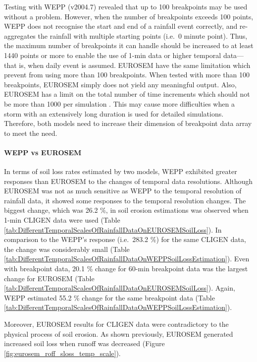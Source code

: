 Testing with WEPP (v2004.7) revealed that up to 100 breakpoints may be used
without a problem. However, when the number of breakpoints exceeds 100
points, WEPP does not recognise the start and end of a rainfall event correctly,
and re-aggregates the rainfall with multiple starting points (i.e.\ 0 minute
point). Thus, the maximum number of breakpoints it can handle should be
increased to at least 1440 points or more to enable the use of 1-min data or
higher temporal data---that is, when daily event is assumed. EUROSEM have the
same limitation which prevent from using more than 100 breakpoints. When tested
with more than 100 breakpoints, EUROSEM simply does not yield any meaningful
output. Also, EUROSEM has a limit on the total number of time increments which
should not be more than 1000 per simulation
\citep{morgan1998-europeansoilerosion}. This may cause more difficulties when a
storm with an extensively long duration is used for detailed simulations.
Therefore, both models need to increase their dimension of breakpoint data array
to meet the need.

\paragraph{WEPP vs EUROSEM} In terms of soil loss rates estimated by two
models, WEPP exhibited greater responses than EUROSEM to the changes of temporal
data resolutions. Although EUROSEM was not as much sensitive as WEPP to the
temporal
resolution of rainfall data, it showed some responses to the temporal resolution
changes.
The biggest change, which was 26.2 \%, in soil erosion estimations was observed
when 1-min CLIGEN data were used (Table
\ref{tab:DifferentTemporalScalesOfRainfallDataOnEUROSEMSoilLoss}).
In comparison to the WEPP's response (i.e.\ 283.2 \%) for the same CLIGEN data,
the change was considerably small (Table
\ref{tab:DifferentTemporalScalesOfRainfallDataOnWEPPSoilLossEstimation}). Even
with breakpoint data, 20.1 \% change for 60-min breakpoint data was the largest
change for EUROSEM (Table
\ref{tab:DifferentTemporalScalesOfRainfallDataOnEUROSEMSoilLoss}). Again, WEPP
estimated 55.2 \% change for the same breakpoint data (Table
\ref{tab:DifferentTemporalScalesOfRainfallDataOnWEPPSoilLossEstimation}).

Moreover, EUROSEM results for CLIGEN data were contradictory to the physical
process of soil erosion. As shown previously, EUROSEM generated increased soil
loss when runoff was decreased (Figure \ref{fig:eurosem_roff_sloss_temp_scale}).

